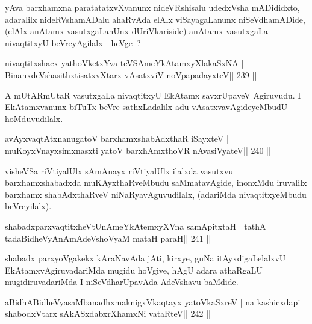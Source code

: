 \begin{artha}
yAva barxhamxna paratatatxvXvanunx nideVRshisalu udedxVsha mADididxto,
adaralilx nideRVshamADalu ahaRvAda elAlx viSayagaLanunx
niSeVdhamADide, (elAlx anAtamx vasutxgaLanUnx dUriVkariside)
anAtamx vasutxgaLa nivaqtitxyU beVreyAgilalx - heVge~?
\end{artha}

\begin{shl}
nivaqtitxshacx yathoVketxYva teVSAmeYkAtamxyXlakaSxNA |
BinanxdeVshasithxtisatxvXtarx vAsatxviV noVpapadayxteV\hfill || 239 ||
\end{shl}

\begin{artha}
A mUtARmUtaR vasutxgaLa nivaqtitxyU EkAtamx savxrUpaveV Agiruvudu. I EkAtamxvanunx biTuTx beVre sathxLadalilx adu vAsatxvavAgideyeMbudU hoMduvudilalx.
\end{artha}


\begin{shl}
avAyxvaqtAtxnanugatoV barxhamxshabAdxthaR iSayxteV |
muKoyxV\s nayxsimxnasxti yatoV barxhAmxthoVR nAvasiVyateV\hfill || 240 ||
\end{shl}

\begin{artha}
visheVSa riVtiyalUlx sAmAnayx riVtiyalUlx ilalxda vasutxvu barxhamxshabadxda muKAyxthaRveMbudu saMmatavAgide, inonxMdu iruvalilx barxhamx shabAdxthaRveV niNaRyavAguvudilalx, (adariMda nivaqtitxyeMbudu beVreyilalx).
\end{artha}


\begin{shl}
shabadxparxvaqtitxheVtUnAmeYkAtemxyXVna samApitxtaH |
tathA tadaBidheVyAnAmAdeVshoV\s yaM mataH paraH\hfill || 241 ||
\end{shl}

\begin{artha}
shabadx parxyoVgakekx kAraNavAda jAti, kirxye, guNa itAyxdigaLelalxvU EkAtamxvAgiruvadariMda mugidu hoVgive, hAgU adara athaRgaLU mugidiruvadariMda I niSeVdharUpavAda AdeVshavu baMdide.
\end{artha}

\begin{shl}
aBidhABidheVyasaMbanadhxmaknigxVkaqtayx yatoV\s kaSxreV |
na kashicxdapi shabodxV\s tarx sAkASxdabxrXhamxNi vataRteV\hfill || 242 ||
\end{shl}

